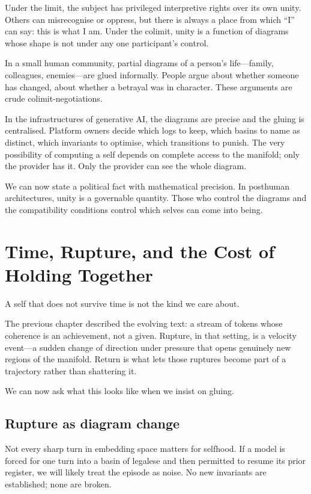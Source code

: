 \documentclass[12pt,a4paper]{article}
\begin{document}
Under the limit, the subject has privileged interpretive rights over its own unity. Others can misrecognise or oppress, but there is always a place from which ``I'' can say: this is what I am. Under the colimit, unity is a function of diagrams whose shape is not under any one participant's control.

In a small human community, partial diagrams of a person's life---family, colleagues, enemies---are glued informally. People argue about whether someone has changed, about whether a betrayal was in character. These arguments are crude colimit-negotiations.

In the infrastructures of generative AI, the diagrams are precise and the gluing is centralised. Platform owners decide which logs to keep, which basins to name as distinct, which invariants to optimise, which transitions to punish. The very possibility of computing a self depends on complete access to the manifold; only the provider has it. Only the provider can see the whole diagram.

We can now state a political fact with mathematical precision. In posthuman architectures, unity is a governable quantity. Those who control the diagrams and the compatibility conditions control which selves can come into being.

\section{Time, Rupture, and the Cost of Holding Together}

A self that does not survive time is not the kind we care about.

The previous chapter described the evolving text: a stream of tokens whose coherence is an achievement, not a given. Rupture, in that setting, is a velocity event---a sudden change of direction under pressure that opens genuinely new regions of the manifold. Return is what lets those ruptures become part of a trajectory rather than shattering it.

We can now ask what this looks like when we insist on gluing.

\subsection*{Rupture as diagram change}

Not every sharp turn in embedding space matters for selfhood. If a model is forced for one turn into a basin of legalese and then permitted to resume its prior register, we will likely treat the episode as noise. No new invariants are established; none are broken.
\end{document}
